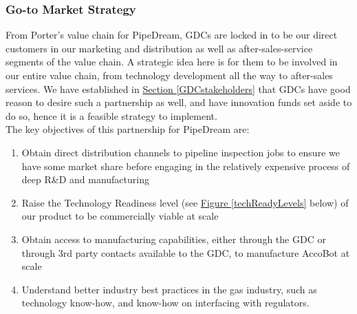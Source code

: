 \documentclass[11pt]{article}		%
\newcommand{\figref}[1]{\hyperref[#1]{Figure \ref*{#1}}}    %
\newcommand{\sectref}[1]{\hyperref[#1]{Section \ref*{#1}}}     %
\begin{document}
    	\subsubsection{Go-to Market Strategy}
    	From Porter’s value chain for PipeDream, GDCs are locked in to be our direct customers in our marketing and distribution as well as after-sales-service segments of the value chain. A strategic idea here is for them to be involved in our entire value chain, from technology development all the way to after-sales services. We have established in \sectref{GDCstakeholders} that GDCs have good reason to desire such a partnership as well, and have innovation funds set aside to do so, hence it is a feasible strategy to implement.
    	\\The key objectives of this partnership for PipeDream are:
        \begin{enumerate}
        \item Obtain direct distribution channels to pipeline inspection jobs to ensure we have some market share before engaging in the relatively expensive process of deep R\&D and manufacturing
        \item Raise the Technology Readiness level (see \figref{techReadyLevels} below) of our product to be commercially viable at scale 
        \item Obtain access to manufacturing capabilities, either through the GDC or through 3rd party contacts available to the GDC, to manufacture AccoBot at scale
        \item Understand better industry best practices in the gas industry, such as technology know-how, and know-how on interfacing with regulators. 
        \end{enumerate}
\end{document}
